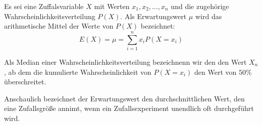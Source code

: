 \documentclass[../MAIN/main.tex]{subfiles}
\begin{document}
\begin{Definition}[- Erwartungswert]
  Es sei eine Zuffalsvariable $X$ mit Werten $x_1,x_2,...,x_n$ und die zugehörige Wahrscheinlichkeitsverteilung $P(X)$. Als Erwartungswert $\mu$ wird das arithmetische Mittel der Werte von $P(X)$ bezeichnet:
  $$E(X)=\mu=\sum_{i=1}^{n}x_i P(X=x_i)$$
\end{Definition}
\begin{Definition}
  Als Median einer Wahrscheinlichkeitsverteilung bezeichnenn wir den den Wert $X_n$, ab dem die kumulierte Wahrscheinlichkeit von $P(X=x_i)$ den Wert von $50\%$ überschreitet.
\end{Definition}
\begin{Bemerkung}
  Anschaulich bezeichnet der Erwartungswert den durchschnittlichen Wert, den eine Zufallsgröße annimt, wenn ein Zufallsexperiment unendlich oft durchgeführt wird.
\end{Bemerkung}
\end{document}
